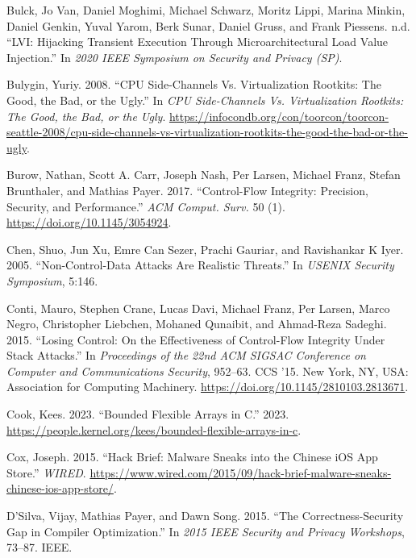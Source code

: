 \documentclass[
  a4paper,
]{report}
\newlength{\cslhangindent}
\newlength{\cslentryspacingunit} %
\newenvironment{CSLReferences}[2] %
 {%
  \setlength{\parindent}{0pt}
  \ifodd #1
  \let\oldpar\par
  \def\par{\hangindent=\cslhangindent\oldpar}
  \fi
  \setlength{\parskip}{#2\cslentryspacingunit}
 }%
 {}
\begin{document}
\begin{CSLReferences}{1}{0}
\leavevmode{}%
Bulck, Jo Van, Daniel Moghimi, Michael Schwarz, Moritz Lippi, Marina
Minkin, Daniel Genkin, Yuval Yarom, Berk Sunar, Daniel Gruss, and Frank
Piessens. n.d. {``{LVI}: Hijacking Transient Execution Through
Microarchitectural Load Value Injection.''} In \emph{2020 {IEEE}
Symposium on Security and Privacy ({SP})}.

\leavevmode{}%
Bulygin, Yuriy. 2008. {``{CPU} Side-Channels Vs. Virtualization
Rootkits: The Good, the Bad, or the Ugly.''} In \emph{CPU Side-Channels
Vs. Virtualization Rootkits: The Good, the Bad, or the Ugly}.
\url{https://infocondb.org/con/toorcon/toorcon-seattle-2008/cpu-side-channels-vs-virtualization-rootkits-the-good-the-bad-or-the-ugly}.

\leavevmode{}%
Burow, Nathan, Scott A. Carr, Joseph Nash, Per Larsen, Michael Franz,
Stefan Brunthaler, and Mathias Payer. 2017. {``Control-Flow Integrity:
Precision, Security, and Performance.''} \emph{ACM Comput. Surv.} 50
(1). \url{https://doi.org/10.1145/3054924}.

\leavevmode{}%
Chen, Shuo, Jun Xu, Emre Can Sezer, Prachi Gauriar, and Ravishankar K
Iyer. 2005. {``Non-Control-Data Attacks Are Realistic Threats.''} In
\emph{USENIX Security Symposium}, 5:146.

\leavevmode{}%
Conti, Mauro, Stephen Crane, Lucas Davi, Michael Franz, Per Larsen,
Marco Negro, Christopher Liebchen, Mohaned Qunaibit, and Ahmad-Reza
Sadeghi. 2015. {``Losing Control: On the Effectiveness of Control-Flow
Integrity Under Stack Attacks.''} In \emph{Proceedings of the 22nd ACM
SIGSAC Conference on Computer and Communications Security}, 952--63. CCS
'15. New York, NY, USA: Association for Computing Machinery.
\url{https://doi.org/10.1145/2810103.2813671}.

\leavevmode{}%
Cook, Kees. 2023. {``Bounded Flexible Arrays in {C}.''} 2023.
\url{https://people.kernel.org/kees/bounded-flexible-arrays-in-c}.

\leavevmode{}%
Cox, Joseph. 2015. {``Hack Brief: Malware Sneaks into the Chinese iOS
App Store.''} \emph{WIRED}.
\url{https://www.wired.com/2015/09/hack-brief-malware-sneaks-chinese-ios-app-store/}.

\leavevmode{}%
D'Silva, Vijay, Mathias Payer, and Dawn Song. 2015. {``The
Correctness-Security Gap in Compiler Optimization.''} In \emph{2015 IEEE
Security and Privacy Workshops}, 73--87. IEEE.


\end{CSLReferences}
\end{document}
